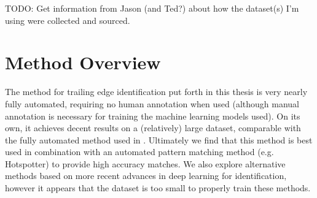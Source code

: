 TODO: Get information from Jason (and Ted?) about how the dataset(s) I'm using were collected and sourced.

\section{Method Overview}

The method for trailing edge identification put forth in this thesis is very nearly fully automated, requiring no human annotation when used (although manual annotation is necessary for training the machine learning models used).
On its own, it achieves decent results on a (relatively) large dataset, comparable with the fully automated method used in \cite{hughes2015automated}. 
Ultimately we find that this method is best used in combination with an automated pattern matching method (e.g. Hotspotter) to provide high accuracy matches.
We also explore alternative methods based on more recent advances in deep learning for identification, however it appears that the dataset is too small to properly train these methods.


